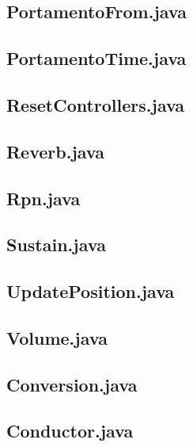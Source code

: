 \subsection{ PortamentoFrom.java }

\subsection{ PortamentoTime.java }

\subsection{ ResetControllers.java }

\subsection{ Reverb.java }

\subsection{ Rpn.java }

\subsection{ Sustain.java }

\subsection{ UpdatePosition.java }

\subsection{ Volume.java }

\subsection{ Conversion.java }

\subsection{ Conductor.java }

